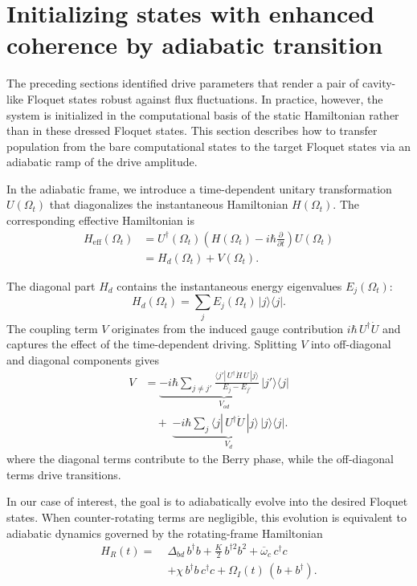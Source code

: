 \section{Initializing states with enhanced coherence by adiabatic transition}
\label{sec:adiabatic_transition}

The preceding sections identified drive parameters that render a pair of cavity-like Floquet states robust against flux fluctuations. In practice, however, the system is initialized in the computational basis of the static Hamiltonian rather than in these dressed Floquet states. This section describes how to transfer population from the bare computational states to the target Floquet states via an adiabatic ramp of the drive amplitude.

In the adiabatic frame, we introduce a time-dependent unitary transformation \(U(\Omega_t)\) that diagonalizes the instantaneous Hamiltonian \(H(\Omega_t)\). The corresponding effective Hamiltonian is
\begin{equation}
\begin{aligned}
H_{\mathrm{eff}}(\Omega_t)
&= U^\dagger(\Omega_t)\!\left( H(\Omega_t) - i\hbar \frac{\partial}{\partial t} \right)\!U(\Omega_t) \\
&= H_d(\Omega_t) + V(\Omega_t).
\end{aligned}
\end{equation}

The diagonal part \(H_d\) contains the instantaneous energy eigenvalues \(E_j(\Omega_t)\):
\begin{equation}
H_d(\Omega_t)=\sum_j E_j(\Omega_t)\,|j\rangle\langle j|.
\end{equation}
The coupling term \(V\) originates from the induced gauge contribution \(i\hbar\,U^\dagger \dot U\) and captures the effect of the time-dependent driving. Splitting \(V\) into off-diagonal and diagonal components gives
\begin{equation}
\begin{aligned}
V
&=
\underbrace{-i\hbar \sum_{j\neq j'} 
\frac{\langle j'|\,U^\dagger \dot H\,U\,|j\rangle}{E_j-E_{j'}}\,|j'\rangle\langle j|}_{V_{od}}
\\
&\quad+\;
\underbrace{-i\hbar \sum_j \langle j|\,U^\dagger \dot U\,|j\rangle\,|j\rangle\langle j|}_{V_d}.
\end{aligned}
\end{equation}
where the diagonal terms contribute to the Berry phase, while the off-diagonal terms drive transitions.

In our case of interest, the goal is to adiabatically evolve into the desired Floquet states. When counter-rotating terms are negligible, this evolution is equivalent to adiabatic dynamics governed by the rotating-frame Hamiltonian
\begin{equation}
\begin{aligned}
H_R(t) =\;&
\Delta_{bd}\, b^\dagger b
+ \frac{K}{2}\, b^{\dagger 2} b^{2}
+ \overline{\omega}_c\, c^\dagger c \\
&+ \chi\, b^\dagger b\, c^\dagger c
+ \Omega_I(t)\, ( b + b^\dagger ) .
\end{aligned}
\end{equation}

